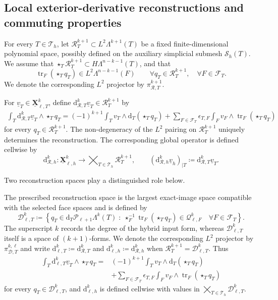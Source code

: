 \documentclass[a4paper,11pt]{article}
\theoremstyle{definition}
\newcommand{\DIFF}{\mathrm{d}}
\newcommand{\Sh}{\mathcal{S}_h}
\newcommand{\PL}[2]{\mathcal{P}_{#1}\Lambda^{#2}}
\newcommand{\uX}[2]{\underline{\boldsymbol{X}}_{\ell,#2}^{#1}}
\newcommand{\uXh}[1]{\underline{\boldsymbol{X}}_{\ell,h}^{#1}}
\newcommand{\Qtrace}[2]{\mathcal Q_{\ell,#1}^{#2}}
\newcommand{\Dpoly}[2]{\mathcal D_{\ell,#1}^{#2}}
\newcommand{\piD}[2]{\pi_{\mathcal D,#1}^{#2,\ell}}
\newcommand{\trc}{\operatorname{tr}}
\newcommand{\epsTF}{\epsilon_{T,F}}
\begin{document}
\subsection{Local exterior-derivative reconstructions and commuting properties}
\label{subsec:hybrid.exterior.derivative}

For every $T\in\mathcal T_h$, let $\mathcal R_T^{k+1}\subset L^2\Lambda^{k+1}(T)$ be a fixed finite-dimensional polynomial space, possibly defined on the auxiliary simplicial submesh $\Sh(T)$.
We assume that $\star_T\mathcal R_T^{k+1} \subset H\Lambda^{n-k-1}(T)$, and that
\[
  \trc_F(\star_Tq_T)
  \in
  L^2\Lambda^{n-k-1}(F)
  \qquad
  \forall q_T\in\mathcal R_T^{k+1},
  \quad
  \forall F\in\mathcal F_T.
\]
We denote the corresponding $L^2$ projector by $\pi_{\mathcal R,T}^{k+1}$.

For $\underline v_T\in\uX{k}{T}$, define $\DIFF_{\mathcal R,T}^{k}\underline v_T\in\mathcal R_T^{k+1}$ by
\begin{equation}\label{eq:def.local.derivative.general.forms}
\begin{aligned}
\int_T
\DIFF_{\mathcal R,T}^{k}\underline v_T
\wedge
\star_Tq_T
={}
(-1)^{k+1}
\int_T
v_T\wedge\DIFF_T(\star_Tq_T)
+
\sum_{F\in\mathcal F_T}
\epsTF
\int_F
v_F\wedge\trc_F(\star_Tq_T)
\end{aligned}
\end{equation}
for every $q_T\in\mathcal R_T^{k+1}$.
The non-degeneracy of the $L^2$ pairing on $\mathcal R_T^{k+1}$ uniquely determines the reconstruction.
The corresponding global operator is defined cellwise by
\[
  \DIFF_{\mathcal R,h}^{k}\colon
  \uXh{k}
  \longrightarrow
  \bigtimes_{T\in\mathcal T_h}
  \mathcal R_T^{k+1},
  \qquad
  (\DIFF_{\mathcal R,h}^{k}\underline v_h)_{|T}
  \coloneqq
  \DIFF_{\mathcal R,T}^{k}\underline v_T.
\]

Two reconstruction spaces play a distinguished role below.

The prescribed reconstruction space is the largest exact-image space compatible with the selected face spaces and is defined by
\[
  \Dpoly{T}{k}
  \coloneqq
  \left\{
    q_T\in\DIFF_T\PL{\ell+1}{k}(T)
    \;:\;
    \star_F^{-1}
    \trc_F(\star_Tq_T)
    \in
    \Qtrace{F}{k}
    \quad
    \forall F\in\mathcal F_T
  \right\}.
\]
The superscript $k$ records the degree of the hybrid input form, whereas $\Dpoly{T}{k}$ itself is a space of $(k+1)$-forms.
We denote the corresponding $L^2$ projector by $\piD{T}{k}$ and write $\DIFF_{\ell,T}^{k} \coloneqq \DIFF_{\mathcal R,T}^{k}$ and $\DIFF_{\ell,h}^{k} \coloneqq \DIFF_{\mathcal R,h}^{k}$ when $\mathcal R_T^{k+1}=\Dpoly{T}{k}$.
Thus
\[
\begin{aligned}
  \int_T
  \DIFF_{\ell,T}^{k}\underline v_T
  \wedge
  \star_Tq_T
  ={}&
  (-1)^{k+1}
  \int_T
  v_T\wedge\DIFF_T(\star_Tq_T)
  \\
  &+
  \sum_{F\in\mathcal F_T}
  \epsTF
  \int_F
  v_F\wedge\trc_F(\star_Tq_T)
\end{aligned}
\]
for every $q_T\in\Dpoly{T}{k}$, and $\DIFF_{\ell,h}^{k}$ is defined cellwise with values in $\bigtimes_{T\in\mathcal T_h}\Dpoly{T}{k}$.
\end{document}
